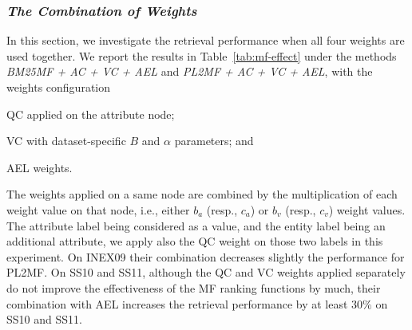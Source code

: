 \subsubsection{\emph{The Combination of Weights}}
\label{sec:combi-weight-effect}

In this section, we investigate the retrieval performance when all four weights are used together. We report the results in Table~\ref{tab:mf-effect} under the methods  \emph{BM25MF + AC + VC + AEL} and \emph{PL2MF + AC + VC + AEL}, with the weights configuration
\begin{inparaenum}[(1)]
    \item QC applied on the attribute node;
    \item VC with dataset-specific $B$ and $\alpha$ parameters; and
    \item AEL weights.
\end{inparaenum}
The weights applied on a same node are combined by the multiplication of each weight value on that node, i.e., either $b_a$ (resp., $c_a$) or $b_v$ (resp., $c_v$) weight values.
The attribute label being considered as a value, and the entity label being an additional attribute, we apply also the QC weight on those two labels in this experiment.
On INEX09 their combination decreases slightly the performance for PL2MF. On SS10 and SS11, although the QC and VC weights applied separately do not improve the effectiveness of the MF ranking functions by much, their combination with AEL increases the retrieval performance by at least $30\%$ on SS10 and SS11.


